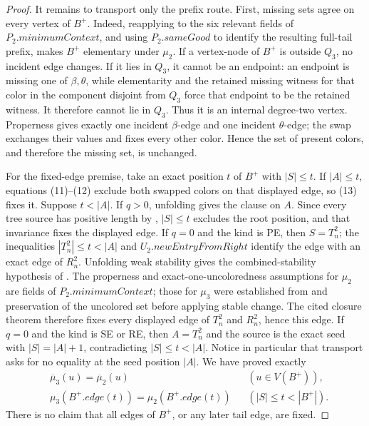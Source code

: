\begin{proof}
It remains to transport only the prefix route.  First, missing sets agree
on every vertex of \(B^+\).  Indeed, reapplying
 to
the six relevant fields of \(P_2.\mathit{minimumContext}\), and using
\(P_2.\mathit{sameGood}\) to identify the resulting full-tail prefix,
makes \(B^+\) elementary under \(\mu_2\).
If a vertex-node of \(B^+\) is outside \(Q_3\), no incident edge changes.
If it lies in \(Q_3\), it cannot be an endpoint: an endpoint is missing
one of \(\beta,\theta\), while elementarity and the retained missing
witness for that color in the component disjoint from \(Q_3\) force that
endpoint to be the retained witness.  It therefore cannot lie in
\(Q_3\).  Thus it is an internal degree-two vertex.  Properness gives
exactly one incident \(\beta\)-edge and one incident \(\theta\)-edge;
the swap exchanges their values and fixes every other color.  Hence the
set of present colors, and therefore the missing set, is unchanged.

For the fixed-edge premise, take an exact position \(t\) of \(B^+\) with
\(|S|\leq t\).  If \(|A|\leq t\), equations (11)--(12) exclude both
swapped colors on that displayed edge, so (13) fixes it.  Suppose
\(t<|A|\).  If \(q>0\), unfolding
 gives the
 clause on \(A\).  Since every tree source
has positive length by , \(|S|\leq t\) excludes
the root position, and that invariance fixes the displayed edge.  If
\(q=0\) and the kind is PE,
then \(S=T_n^2\); the inequalities
\(|T_n^2|\leq t<|A|\) and
\(U_2.\mathit{newEntryFromRight}\) identify the edge with an exact edge
of \(R_n^2\).  Unfolding weak stability gives the combined-stability
hypothesis of .  The properness
and exact-one-uncoloredness assumptions for \(\mu_2\) are fields of
\(P_2.\mathit{minimumContext}\); those for \(\mu_3\) were established
from  and preservation of the
uncolored set before applying stable change.  The cited closure theorem
therefore fixes every displayed edge of \(T_n^2\) and \(R_n^2\), hence
this edge.  If \(q=0\)
and the kind is SE or RE, then \(A=T_n^2\) and the source is the exact
seed with \(|S|=|A|+1\), contradicting \(|S|\leq t<|A|\).  Notice in
particular that transport asks for no equality at the seed position
\(|A|\).  We have proved exactly
\[
 \begin{aligned}
 &\overline\mu_3(u)=\overline\mu_2(u)
       &&(u\in V(B^+)),\\
 &\mu_3(B^+.\mathit{edge}(t))=\mu_2(B^+.\mathit{edge}(t))
       &&(|S|\leq t<|B^+|).
 \end{aligned}                                                \tag{14}
\]
There is no claim that all edges of \(B^+\), or any later tail edge, are
fixed.


\end{proof}
